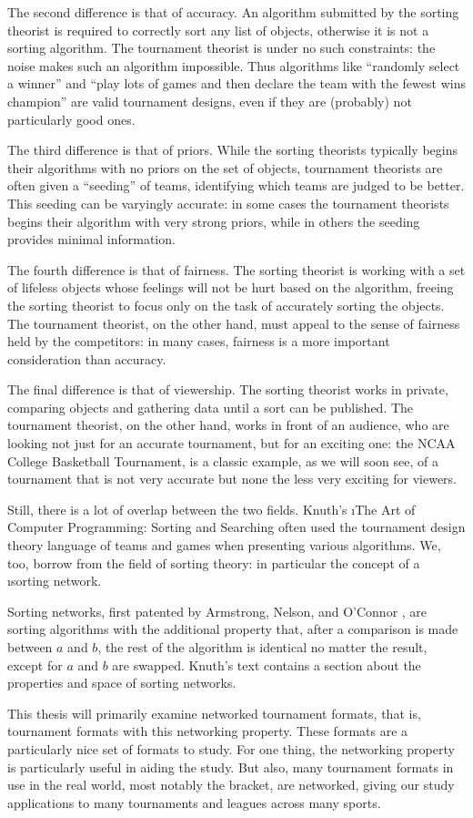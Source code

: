 {    The second difference is that of accuracy. An algorithm submitted by the sorting theorist is required to correctly sort any list of objects, otherwise it is not a sorting algorithm. The tournament theorist is under no such constraints: the noise makes such an algorithm impossible. Thus algorithms like ``randomly select a winner'' and ``play lots of games and then declare the team with the fewest wins champion'' are valid tournament designs, even if they are (probably) not particularly good ones.

    The third difference is that of priors. While the sorting theorists typically begins their algorithms with no priors on the set of objects, tournament theorists are often given a ``seeding'' of teams, identifying which teams are judged to be better. This seeding can be varyingly accurate: in some cases the tournament theorists begins their algorithm with very strong priors, while in others the seeding provides minimal information.

    The fourth difference is that of fairness. The sorting theorist is working with a set of lifeless objects whose feelings will not be hurt based on the algorithm, freeing the sorting theorist to focus only on the task of accurately sorting the objects. The tournament theorist, on the other hand, must appeal to the sense of fairness held by the competitors: in many cases, fairness is a more important consideration than accuracy. 
    
    The final difference is that of viewership. The sorting theorist works in private, comparing objects and gathering data until a sort can be published. The tournament theorist, on the other hand, works in front of an audience, who are looking not just for an accurate tournament, but for an exciting one: the NCAA College Basketball Tournament, is a classic example, as we will soon see, of a tournament that is not very accurate but none the less very exciting for viewers.

    Still, there is a lot of overlap between the two fields. Knuth's \i{The Art of Computer Programming: Sorting and Searching} \cite{knuth} often used the tournament design theory language of teams and games when presenting various algorithms. We, too, borrow from the field of sorting theory: in particular the concept of a \i{sorting network}.

    Sorting networks, first patented by Armstrong, Nelson, and O'Connor \cite{pat}, are sorting algorithms with the additional property that, after a comparison is made between $a$ and $b$, the rest of the algorithm is identical no matter the result, except for $a$ and $b$ are swapped. Knuth's text contains a section about the properties and space of sorting networks.

    This thesis will primarily examine networked tournament formats, that is, tournament formats with this networking property. These formats are a particularly nice set of formats to study. For one thing, the networking property is particularly useful in aiding the study. But also, many tournament formats in use in the real world, most notably the bracket, are networked, giving our study applications to many tournaments and leagues across many sports.
}



